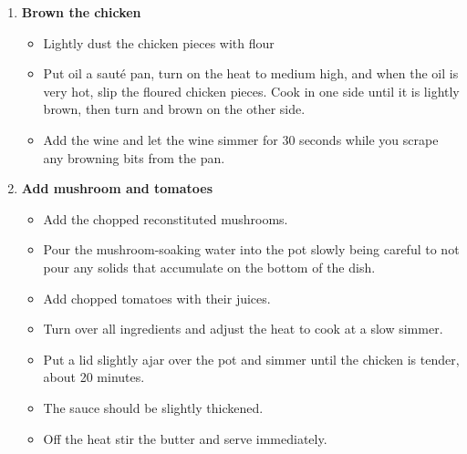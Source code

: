 \documentclass [11pt, letterpaper] {article}
\begin{document}
\begin{description}
\begin{enumerate}
	\item {\bf Brown the chicken}
	\begin{itemize}
	\item Lightly dust the chicken pieces with flour
	\item Put oil a saut\'e pan, turn on the heat to medium high, and when the oil is very hot, slip the floured chicken pieces. Cook in one side until it is lightly brown, then turn and brown on the other side.
	\item Add the wine and let the wine simmer for 30 seconds while you scrape any browning bits from the pan.
	\end{itemize}

	\item {\bf Add mushroom and tomatoes }
	\begin{itemize}
	\item Add the chopped reconstituted mushrooms.
	\item Pour the mushroom-soaking water into the pot slowly being careful to not pour any solids that accumulate on the bottom of the dish.
	\item Add chopped tomatoes with their juices. 
	\item Turn over all ingredients and adjust the heat to cook at a slow simmer.
	\item Put a lid slightly ajar over the pot and simmer until the chicken is tender, about 20 minutes.
	\item The sauce should be slightly thickened.
	\item Off the heat stir the butter and serve immediately.
	\end{itemize}

	\end{enumerate}
\end{description}
\end{document}

